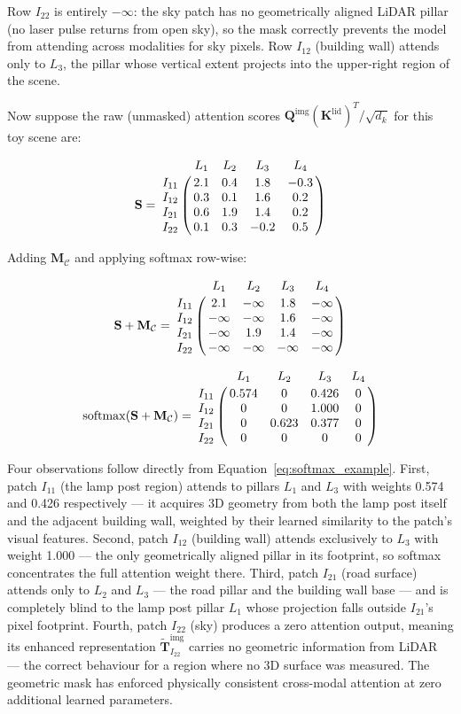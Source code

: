 \documentclass{book}
\begin{document}
\noindent Row $I_{22}$ is entirely $-\infty$: the sky patch has no
geometrically aligned LiDAR pillar (no laser pulse returns from
open sky), so the mask correctly prevents the model from attending
across modalities for sky pixels.  Row $I_{12}$ (building wall)
attends only to $L_3$, the pillar whose vertical extent projects
into the upper-right region of the scene.

Now suppose the raw (unmasked) attention scores
$\mathbf{Q}^{\text{img}}(\mathbf{K}^{\text{lid}})^T / \sqrt{d_k}$
for this toy scene are:

\begin{equation}
  \mathbf{S} =
  \bordermatrix{
        & L_1  & L_2  & L_3  & L_4  \cr
    I_{11} & 2.1  & 0.4  & 1.8  & -0.3 \cr
    I_{12} & 0.3  & 0.1  & 1.6  &  0.2 \cr
    I_{21} & 0.6  & 1.9  & 1.4  &  0.2 \cr
    I_{22} & 0.1  & 0.3  & -0.2 &  0.5
  }
  \label{eq:scores_example}
\end{equation}

Adding $\mathbf{M}_{\mathcal{C}}$ and applying softmax row-wise:

\begin{equation}
  \mathbf{S} + \mathbf{M}_{\mathcal{C}} =
  \bordermatrix{
        & L_1      & L_2      & L_3      & L_4      \cr
    I_{11} & 2.1      & -\infty  & 1.8      & -\infty  \cr
    I_{12} & -\infty  & -\infty  & 1.6      & -\infty  \cr
    I_{21} & -\infty  & 1.9      & 1.4      & -\infty  \cr
    I_{22} & -\infty  & -\infty  & -\infty  & -\infty
  }
\end{equation}

\begin{equation}
  \mathrm{softmax}(\mathbf{S} + \mathbf{M}_{\mathcal{C}}) =
  \bordermatrix{
        & L_1   & L_2   & L_3   & L_4  \cr
    I_{11} & 0.574 & 0     & 0.426 & 0    \cr
    I_{12} & 0     & 0     & 1.000 & 0    \cr
    I_{21} & 0     & 0.623 & 0.377 & 0    \cr
    I_{22} & 0     & 0     & 0     & 0
  }
  \label{eq:softmax_example}
\end{equation}

Four observations follow directly from
Equation~\eqref{eq:softmax_example}.  First, patch $I_{11}$ (the
lamp post region) attends to pillars $L_1$ and $L_3$ with weights
0.574 and 0.426 respectively --- it acquires 3D geometry from both
the lamp post itself and the adjacent building wall, weighted by
their learned similarity to the patch's visual features.  Second,
patch $I_{12}$ (building wall) attends exclusively to $L_3$ with
weight 1.000 --- the only geometrically aligned pillar in its
footprint, so softmax concentrates the full attention weight there.
Third, patch $I_{21}$ (road surface) attends only to $L_2$ and
$L_3$ --- the road pillar and the building wall base --- and is
completely blind to the lamp post pillar $L_1$ whose projection
falls outside $I_{21}$'s pixel footprint.  Fourth, patch $I_{22}$
(sky) produces a zero attention output, meaning its enhanced
representation $\widetilde{\mathbf{T}}^{\text{img}}_{I_{22}}$
carries no geometric information from LiDAR --- the correct
behaviour for a region where no 3D surface was measured.  The
geometric mask has enforced physically consistent cross-modal
attention at zero additional learned parameters.
\end{document}
